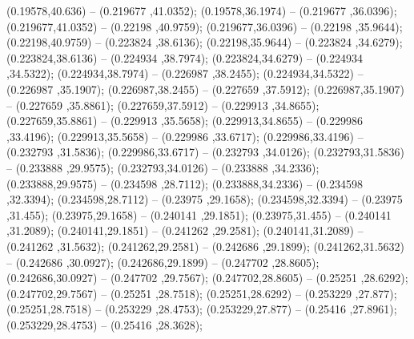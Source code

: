  (0.19578,40.636) -- (0.219677 ,41.0352);
 (0.19578,36.1974) -- (0.219677 ,36.0396);
 (0.219677,41.0352) -- (0.22198 ,40.9759);
 (0.219677,36.0396) -- (0.22198 ,35.9644);
 (0.22198,40.9759) -- (0.223824 ,38.6136);
 (0.22198,35.9644) -- (0.223824 ,34.6279);
 (0.223824,38.6136) -- (0.224934 ,38.7974);
 (0.223824,34.6279) -- (0.224934 ,34.5322);
 (0.224934,38.7974) -- (0.226987 ,38.2455);
 (0.224934,34.5322) -- (0.226987 ,35.1907);
 (0.226987,38.2455) -- (0.227659 ,37.5912);
 (0.226987,35.1907) -- (0.227659 ,35.8861);
 (0.227659,37.5912) -- (0.229913 ,34.8655);
 (0.227659,35.8861) -- (0.229913 ,35.5658);
 (0.229913,34.8655) -- (0.229986 ,33.4196);
 (0.229913,35.5658) -- (0.229986 ,33.6717);
 (0.229986,33.4196) -- (0.232793 ,31.5836);
 (0.229986,33.6717) -- (0.232793 ,34.0126);
 (0.232793,31.5836) -- (0.233888 ,29.9575);
 (0.232793,34.0126) -- (0.233888 ,34.2336);
 (0.233888,29.9575) -- (0.234598 ,28.7112);
 (0.233888,34.2336) -- (0.234598 ,32.3394);
 (0.234598,28.7112) -- (0.23975 ,29.1658);
 (0.234598,32.3394) -- (0.23975 ,31.455);
 (0.23975,29.1658) -- (0.240141 ,29.1851);
 (0.23975,31.455) -- (0.240141 ,31.2089);
 (0.240141,29.1851) -- (0.241262 ,29.2581);
 (0.240141,31.2089) -- (0.241262 ,31.5632);
 (0.241262,29.2581) -- (0.242686 ,29.1899);
 (0.241262,31.5632) -- (0.242686 ,30.0927);
 (0.242686,29.1899) -- (0.247702 ,28.8605);
 (0.242686,30.0927) -- (0.247702 ,29.7567);
 (0.247702,28.8605) -- (0.25251 ,28.6292);
 (0.247702,29.7567) -- (0.25251 ,28.7518);
 (0.25251,28.6292) -- (0.253229 ,27.877);
 (0.25251,28.7518) -- (0.253229 ,28.4753);
 (0.253229,27.877) -- (0.25416 ,27.8961);
 (0.253229,28.4753) -- (0.25416 ,28.3628);
